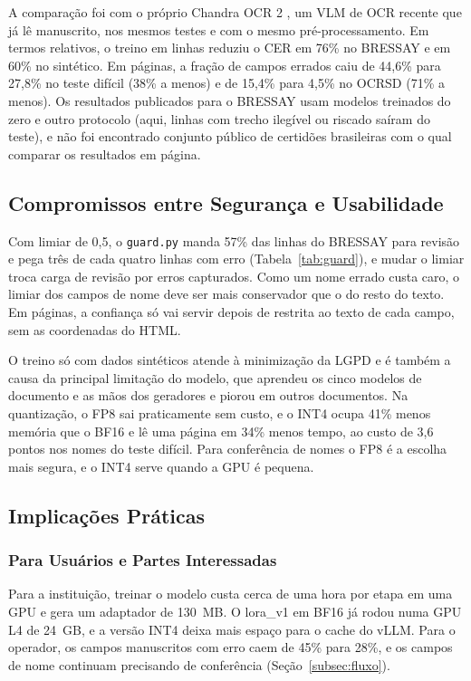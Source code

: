 A comparação foi com o próprio Chandra OCR 2 \cite{chandra2026}, um VLM de OCR recente que já lê manuscrito, nos mesmos testes e com o mesmo pré-processamento. Em termos relativos, o treino em linhas reduziu o CER em 76\% no BRESSAY e em 60\% no sintético. Em páginas, a fração de campos errados caiu de 44,6\% para 27,8\% no teste difícil (38\% a menos) e de 15,4\% para 4,5\% no OCRSD (71\% a menos). Os resultados publicados para o BRESSAY \cite{bressay2023} usam modelos treinados do zero e outro protocolo (aqui, linhas com trecho ilegível ou riscado saíram do teste), e não foi encontrado conjunto público de certidões brasileiras com o qual comparar os resultados em página.

\subsection{Compromissos entre Segurança e Usabilidade}

Com limiar de 0,5, o \texttt{guard.py} manda 57\% das linhas do BRESSAY para revisão e pega três de cada quatro linhas com erro (Tabela~\ref{tab:guard}), e mudar o limiar troca carga de revisão por erros capturados. Como um nome errado custa caro, o limiar dos campos de nome deve ser mais conservador que o do resto do texto. Em páginas, a confiança só vai servir depois de restrita ao texto de cada campo, sem as coordenadas do HTML.

O treino só com dados sintéticos atende à minimização da LGPD e é também a causa da principal limitação do modelo, que aprendeu os cinco modelos de documento e as mãos dos geradores e piorou em outros documentos. Na quantização, o FP8 sai praticamente sem custo, e o INT4 ocupa 41\% menos memória que o BF16 e lê uma página em 34\% menos tempo, ao custo de 3,6 pontos nos nomes do teste difícil. Para conferência de nomes o FP8 é a escolha mais segura, e o INT4 serve quando a GPU é pequena.

\subsection{Implicações Práticas}

\subsubsection{Para Usuários e Partes Interessadas}
Para a instituição, treinar o modelo custa cerca de uma hora por etapa em uma GPU e gera um adaptador de 130~MB. O lora\_v1 em BF16 já rodou numa GPU L4 de 24~GB, e a versão INT4 deixa mais espaço para o cache do vLLM. Para o operador, os campos manuscritos com erro caem de 45\% para 28\%, e os campos de nome continuam precisando de conferência (Seção~\ref{subsec:fluxo}).

